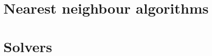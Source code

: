 \section{Nearest neighbour algorithms}
\label{nearestNeighbourAlgorithms}


\section{Solvers}
\label{solvers}

